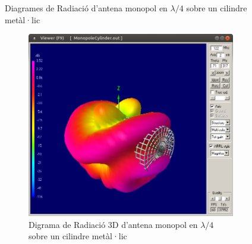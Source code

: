 \begin{figure}[H]
\begin{subfigure}[b]{0.32\textwidth}
	  \caption{}
	  \label{1diag2}
	  \end{subfigure}
	  \vspace{10pt}
	\caption{Diagrames de Radiació d'antena monopol en $\lambda/4$ sobre un cilindre metàl·lic}
	\label{diag1}
	\end{figure}

	\begin{figure}[H]
	\centering
	  \begin{subfigure}[b]{0.53\textwidth}
	  \includegraphics[width=\textwidth]{./images/5.Monopole_cylinder/3d.png}
	  \caption{Digrama de Radiació 3D d'antena monopol en $\lambda/4$ sobre un cilindre metàl·lic}
	  \label{1diag3d}
	  \end{subfigure}
	  \qquad %
	  \begin{subfigure}[b]{0.32\textwidth}

\end{subfigure}
\end{figure}
